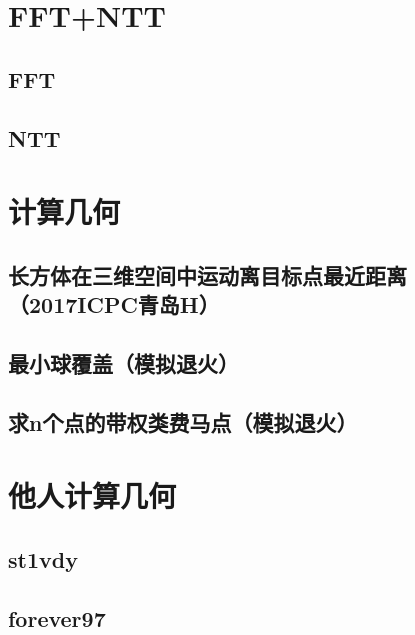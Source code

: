 \documentclass[twoside,a4paper]{article}
\begin{document}
\small

\newpage
\pagestyle{empty}
\renewcommand{\contentsname}{目录}
\tableofcontents
\newpage\clearpage
\newpage
\pagestyle{fancy}
\setcounter{page}{1}   %

\section{FFT+NTT}

\subsection{FFT}


\subsection{NTT}


\section{计算几何}

\subsection{长方体在三维空间中运动离目标点最近距离（2017ICPC青岛H）}


\subsection{最小球覆盖（模拟退火）}


\subsection{求n个点的带权类费马点（模拟退火）}



\section{他人计算几何}
\subsection{st1vdy}

\subsection{forever97}

\end{document}
